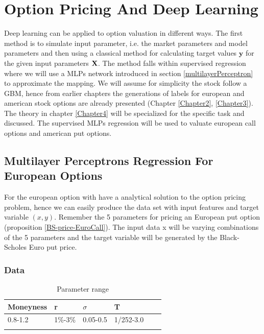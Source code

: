
\chapter{Option Pricing And Deep Learning} %

\label{Chapter5} %

Deep learning can be applied to option valuation in different ways. The first method is to simulate input parameter, i.e. the market parameters and model parameters and then using a classical method for calculating target values $\bm{y}$ for the given input parameters $\mathbf{X}$. The method falls within supervised regression where we will use a MLPs network introduced in section \ref{multilayerPerceptron} to approximate the mapping. We will assume for simplicity the stock follow a GBM, hence from earlier chapters the generations of labels for european and american stock options are already presented (Chapter \ref{Chapter2}, \ref{Chapter3}). The theory in chapter \ref{Chapter4} will be specialized for the specific task and discussed. The supervised MLPs regression will be used to valuate european call options and american put options.


\section{Multilayer Perceptrons Regression For European Options}
For the european option with have a analytical solution to the option pricing problem, hence we can easily produce the data set with input features and target variable $(x,y)$. Remember the 5 parameters for pricing an European put option (proposition \ref{BS-price-EuroCall}). The input data x will be varying combinations of the 5 parameters and the target variable will be generated by the Black-Scholes Euro put price. 

\subsection{Data}

\begin{table}[th]
\caption{Parameter range}
\label{tab:treatments}
\centering
\begin{tabular}{l l l l l l }
\toprule
\textbf{Moneyness} & \textbf{r} & \textbf{$\sigma$} & \textbf{T} \\
\midrule
0.8-1.2 & 1\%-3\% & 0.05-0.5 & 1/252-3.0\\ 
\bottomrule\\
\end{tabular}
\end{table}


